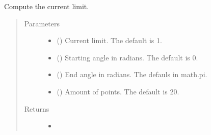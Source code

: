 \documentclass[letterpaper,10pt,english]{sphinxmanual}
\begin{document}
\begin{fulllineitems}
\begin{fulllineitems}
\label{\detokenize{control.sm:control.sm.torque.TorqueCharacteristics.current_limit}}
\pysigstartsignatures
{}
\pysigstopsignatures
\sphinxAtStartPar
Compute the current limit.
\begin{quote}\begin{description}
\item[{Parameters}] \leavevmode\begin{itemize}
\item {} 
\sphinxAtStartPar
{} (\sphinxstyleliteralemphasis{\sphinxupquote{, }}) \textendash{} Current limit. The default is 1.

\item {} 
\sphinxAtStartPar
{} (\sphinxstyleliteralemphasis{\sphinxupquote{, }}) \textendash{} Starting angle in radians. The default is 0.

\item {} 
\sphinxAtStartPar
{} (\sphinxstyleliteralemphasis{\sphinxupquote{, }}) \textendash{} End angle in radians. The defauls in math.pi.

\item {} 
\sphinxAtStartPar
{} (\sphinxstyleliteralemphasis{\sphinxupquote{, }}) \textendash{} Amount of points. The default is 20.

\end{itemize}

\item[{Returns}] \leavevmode
\sphinxAtStartPar
\begin{itemize}
\item {} 
\sphinxAtStartPar
{}


\end{itemize}
\end{description}
\end{quote}
\end{fulllineitems}
\end{fulllineitems}
\end{document}
